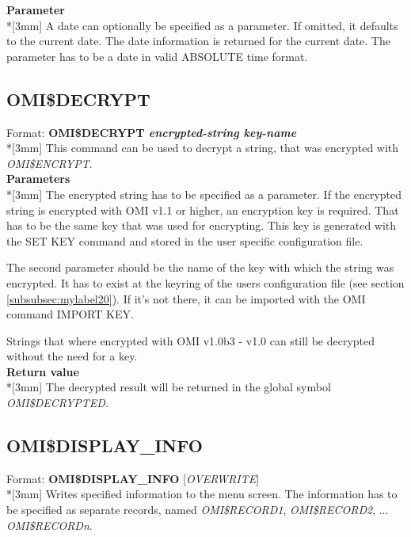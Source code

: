 \documentclass[a4paper]{book}
\newcommand{\vs}{\vspace{3mm}}
\renewcommand{\indent}{\hspace*{5mm}}
\begin{document}
\vs

\noindent\textbf{Parameter}\\*[3mm]
A date can optionally be specified as a parameter. If omitted, it defaults 
to the current date. The date information is returned for the current date. 
The parameter has to be a date in valid ABSOLUTE time format.

\subsection{OMI{\$}DECRYPT}
\label{subsubsec:mylabel50}

\indent Format: \textbf{OMI{\$}DECRYPT \textit{encrypted-string key-name}}\\*[3mm]
This command can be used to decrypt a string, that was encrypted with 
\linebreak\textsl{OMI{\$}ENCRYPT}.\\[3mm]
\textbf{Parameters}\\*[3mm]
The encrypted string has to be specified as a parameter. If the encrypted 
string is encrypted with OMI v1.1 or higher, an encryption key is required. 
That has to be the same key that was used for encrypting. This key is 
generated with the \textsf{SET KEY} command and stored in the user specific 
configuration file.

\vs

The second parameter should be the name of the key with which the string was 
encrypted. It has to exist at the keyring of the users configuration file 
(see section \ref{subsubsec:mylabel20}). If it's not there, it can be 
imported with the OMI command \textsf{IMPORT KEY}.

Strings that where encrypted with OMI v1.0b3 - v1.0 can still be decrypted 
without the need for a key.\\[3mm]
\textbf{Return value}\\*[3mm]
The decrypted result will be returned in the global symbol \textsl{OMI{\$}DECRYPTED}.

\subsection{OMI{\$}DISPLAY{\_}INFO}
\label{subsubsec:mylabel51}

\indent Format: \textbf{OMI{\$}DISPLAY{\_}INFO} [\textit{OVERWRITE}]\\*[3mm]
Writes specified information to the menu screen. The information has to be 
specified as separate records, named \textsl{OMI{\$}RECORD1}, \textsl{OMI{\$}RECORD2}, ... 
\textsl{OMI{\$}RECORD\textit{n}}.
\end{document}
